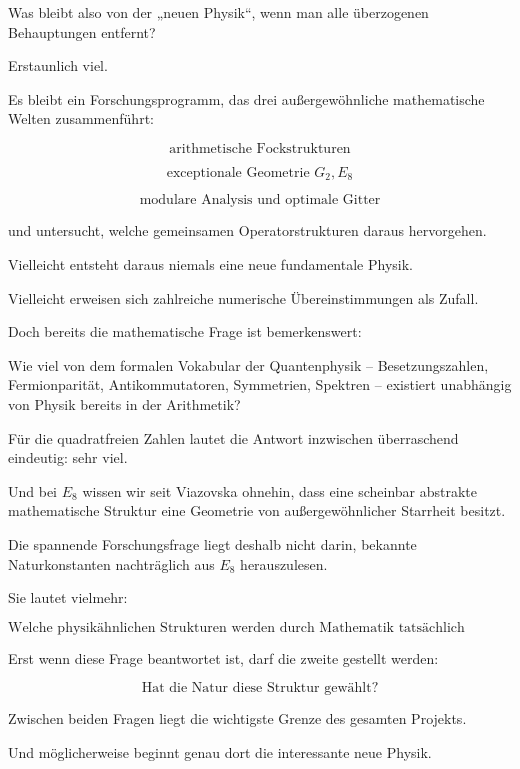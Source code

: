 \documentclass[11pt,a4paper]{article}
\begin{document}
Was bleibt also von der „neuen Physik“, wenn man alle überzogenen Behauptungen entfernt?


Erstaunlich viel.


Es bleibt ein Forschungsprogramm, das drei außergewöhnliche mathematische Welten zusammenführt:


\[
\boxed{
\text{arithmetische Fockstrukturen}
}
\]


\[
\boxed{
\text{exceptionale Geometrie }
G_2,E_8
}
\]


\[
\boxed{
\text{modulare Analysis und optimale Gitter}
}
\]


und untersucht, welche gemeinsamen Operatorstrukturen daraus hervorgehen.


Vielleicht entsteht daraus niemals eine neue fundamentale Physik.


Vielleicht erweisen sich zahlreiche numerische Übereinstimmungen als Zufall.


Doch bereits die mathematische Frage ist bemerkenswert:


Wie viel von dem formalen Vokabular der Quantenphysik – Besetzungszahlen, Fermionparität, Antikommutatoren, Symmetrien, Spektren – existiert unabhängig von Physik bereits in der Arithmetik?


Für die quadratfreien Zahlen lautet die Antwort inzwischen überraschend eindeutig: sehr viel.


Und bei \(E_8\) wissen wir seit Viazovska ohnehin, dass eine scheinbar abstrakte mathematische Struktur eine Geometrie von außergewöhnlicher Starrheit besitzt.


Die spannende Forschungsfrage liegt deshalb nicht darin, bekannte Naturkonstanten nachträglich aus \(E_8\) herauszulesen.


Sie lautet vielmehr:


\[
\boxed{
\text{Welche physikähnlichen Strukturen werden durch Mathematik tatsächlich erzwungen?}
}
\]


Erst wenn diese Frage beantwortet ist, darf die zweite gestellt werden:


\[
\boxed{
\text{Hat die Natur diese Struktur gewählt?}
}
\]


Zwischen beiden Fragen liegt die wichtigste Grenze des gesamten Projekts.


Und möglicherweise beginnt genau dort die interessante neue Physik.
\end{document}
